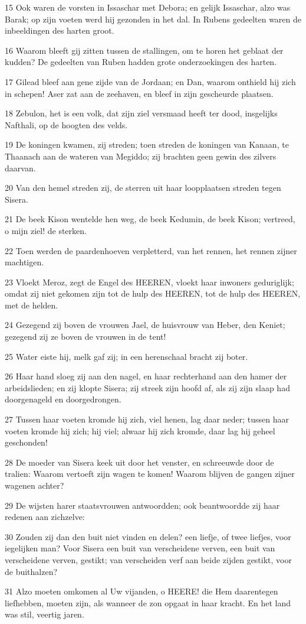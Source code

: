 \par 15 Ook waren de vorsten in Issaschar met Debora; en gelijk Issaschar, alzo was Barak; op zijn voeten werd hij gezonden in het dal. In Rubens gedeelten waren de inbeeldingen des harten groot.
\par 16 Waarom bleeft gij zitten tussen de stallingen, om te horen het geblaat der kudden? De gedeelten van Ruben hadden grote onderzoekingen des harten.
\par 17 Gilead bleef aan gene zijde van de Jordaan; en Dan, waarom onthield hij zich in schepen! Aser zat aan de zeehaven, en bleef in zijn gescheurde plaatsen.
\par 18 Zebulon, het is een volk, dat zijn ziel versmaad heeft ter dood, insgelijks Nafthali, op de hoogten des velds.
\par 19 De koningen kwamen, zij streden; toen streden de koningen van Kanaan, te Thaanach aan de wateren van Megiddo; zij brachten geen gewin des zilvers daarvan.
\par 20 Van den hemel streden zij, de sterren uit haar loopplaatsen streden tegen Sisera.
\par 21 De beek Kison wentelde hen weg, de beek Kedumin, de beek Kison; vertreed, o mijn ziel! de sterken.
\par 22 Toen werden de paardenhoeven verpletterd, van het rennen, het rennen zijner machtigen.
\par 23 Vloekt Meroz, zegt de Engel des HEEREN, vloekt haar inwoners geduriglijk; omdat zij niet gekomen zijn tot de hulp des HEEREN, tot de hulp des HEEREN, met de helden.
\par 24 Gezegend zij boven de vrouwen Jael, de huisvrouw van Heber, den Keniet; gezegend zij ze boven de vrouwen in de tent!
\par 25 Water eiste hij, melk gaf zij; in een herenschaal bracht zij boter.
\par 26 Haar hand sloeg zij aan den nagel, en haar rechterhand aan den hamer der arbeidslieden; en zij klopte Sisera; zij streek zijn hoofd af, als zij zijn slaap had doorgenageld en doorgedrongen.
\par 27 Tussen haar voeten kromde hij zich, viel henen, lag daar neder; tussen haar voeten kromde hij zich; hij viel; alwaar hij zich kromde, daar lag hij geheel geschonden!
\par 28 De moeder van Sisera keek uit door het venster, en schreeuwde door de tralien: Waarom vertoeft zijn wagen te komen! Waarom blijven de gangen zijner wagenen achter?
\par 29 De wijsten harer staatsvrouwen antwoordden; ook beantwoordde zij haar redenen aan zichzelve:
\par 30 Zouden zij dan den buit niet vinden en delen? een liefje, of twee liefjes, voor iegelijken man? Voor Sisera een buit van verscheidene verven, een buit van verscheidene verven, gestikt; van verscheiden verf aan beide zijden gestikt, voor de buithalzen?
\par 31 Alzo moeten omkomen al Uw vijanden, o HEERE! die Hem daarentegen liefhebben, moeten zijn, als wanneer de zon opgaat in haar kracht. En het land was stil, veertig jaren.


